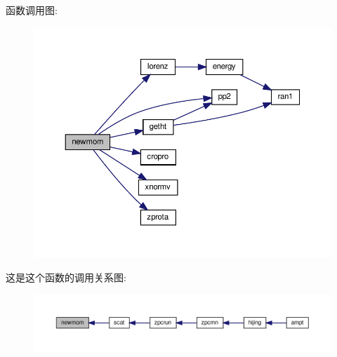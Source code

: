 函数调用图\+:
\nopagebreak
\begin{figure}[H]
\begin{center}
\leavevmode
\includegraphics[width=350pt]{newmom_8f90_af6c0ed23d77e1a3dccb9a107c86fd585_cgraph}
\end{center}
\end{figure}
这是这个函数的调用关系图\+:
\nopagebreak
\begin{figure}[H]
\begin{center}
\leavevmode
\includegraphics[width=350pt]{newmom_8f90_af6c0ed23d77e1a3dccb9a107c86fd585_icgraph}
\end{center}
\end{figure}
